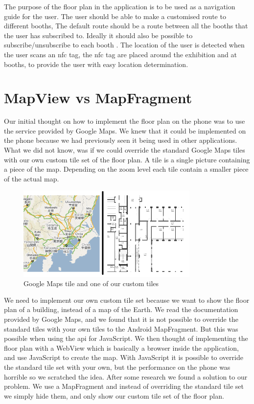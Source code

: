 The purpose of the floor plan in the application is to be used as a navigation guide for the user. The user should be able to make a customised route to different booths, The default route should be a route between all the booths that the user has subscribed to. Ideally it should also be possible to subscribe/unsubscribe to each booth . The location of the user is detected when the user scans an \ac{nfc} tag, the \ac{nfc} tag are placed around the exhibition and at booths, to provide the user with easy location determination.

\section{MapView vs MapFragment}
Our initial thought on how to implement the floor plan on the phone was to use the service provided by Google Maps. We knew that it could be implemented on the phone because we had previously seen it being used in other applications. What we did not know, was if we could override the standard Google Maps tiles with our own custom tile set of the floor plan. A tile is a single picture containing a piece of the map. Depending on the zoom level each tile contain a smaller piece of the actual map.
\begin{figure}[H]
\centering
\includegraphics[width=0.8\textwidth]{img/tilessidebyside.png}
\caption{Google Maps tile and one of our custom tiles \citep{googlemaptile}}
\label{fig:maptiles}
\end{figure}
We need to implement our own custom tile set because we want to show the floor plan of a building, instead of a map of the Earth. We read the documentation provided by Google Maps\citep{googlemapsapi}, and we found that it is not possible to override the standard tiles with your own tiles to the Android MapFragment. But this was possible when using the \ac{api} for JavaScript. We then thought of implementing the floor plan with a WebView which is basically a browser inside the application, and use JavaScript to create the map. With JavaScript it is possible to override the standard tile set with your own, but the performance on the phone was horrible so we scratched the idea. After some research we found a solution to our problem. We use a MapFragment and instead of overriding the standard tile set we simply hide them, and only show our custom tile set of the floor plan.

